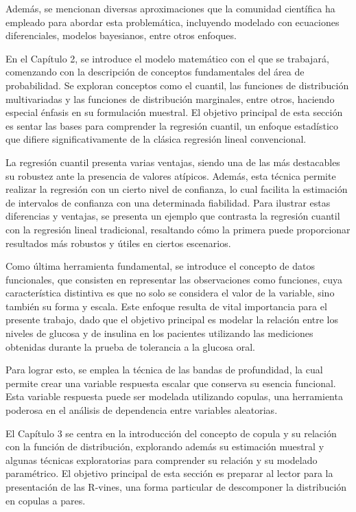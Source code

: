 Además, se mencionan diversas aproximaciones que la comunidad científica ha empleado para abordar esta problemática, incluyendo modelado con ecuaciones diferenciales, modelos bayesianos, entre otros enfoques.

En el Capítulo 2, se introduce el modelo matemático con el que se trabajará, comenzando con la descripción de conceptos fundamentales del área de probabilidad. Se exploran conceptos como el cuantil, las funciones de distribución multivariadas y las funciones de distribución marginales, entre otros, haciendo especial énfasis en su formulación muestral. El objetivo principal de esta sección es sentar las bases para comprender la regresión cuantil, un enfoque estadístico que difiere significativamente de la clásica regresión lineal convencional.

La regresión cuantil presenta varias ventajas, siendo una de las más destacables su robustez ante la presencia de valores atípicos. Además, esta técnica permite realizar la regresión con un cierto nivel de confianza, lo cual facilita la estimación de intervalos de confianza con una determinada fiabilidad. Para ilustrar estas diferencias y ventajas, se presenta un ejemplo que contrasta la regresión cuantil con la regresión lineal tradicional, resaltando cómo la primera puede proporcionar resultados más robustos y útiles en ciertos escenarios.


Como última herramienta fundamental, se introduce el concepto de datos funcionales, que consisten en representar las observaciones como funciones, cuya característica distintiva es que no solo se considera el valor de la variable, sino también su forma y escala. Este enfoque resulta de vital importancia para el presente trabajo, dado que el objetivo principal es modelar la relación entre los niveles de glucosa y de insulina en los pacientes utilizando las mediciones obtenidas durante la prueba de tolerancia a la glucosa oral.

Para lograr esto, se emplea la técnica de las bandas de profundidad, la cual permite crear una variable respuesta escalar que conserva su esencia funcional. Esta variable respuesta puede ser modelada utilizando copulas, una herramienta poderosa en el análisis de dependencia entre variables aleatorias. 

El Capítulo 3 se centra en la introducción del concepto de copula y su relación con la función de distribución, explorando además su estimación muestral y algunas técnicas exploratorias para comprender su relación y su modelado paramétrico. El objetivo principal de esta sección es preparar al lector para la presentación de las R-vines, una forma particular de descomponer la distribución en copulas a pares.

